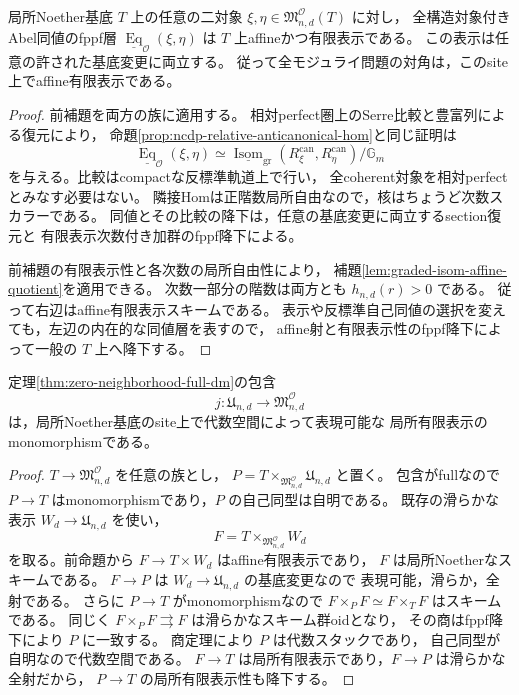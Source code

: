 \begin{proposition}[任意の二族のアフィン有限表示同値層]
\label{prop:full-moduli-affine-diagonal}
局所Noether基底 $T$ 上の任意の二対象
$\xi,\eta\in\mathfrak M^{\mathcal O}_{n,d}(T)$ に対し，
全構造対象付きAbel同値のfppf層
$\underline{\operatorname{Eq}}_{\mathcal O}(\xi,\eta)$ は
$T$ 上affineかつ有限表示である。
この表示は任意の許された基底変更に両立する。
従って全モジュライ問題の対角は，このsite上でaffine有限表示である。
\end{proposition}
\begin{proof}
前補題を両方の族に適用する。
相対perfect圏上のSerre比較と豊富列による復元により，
命題\ref{prop:ncdp-relative-anticanonical-hom}と同じ証明は
\[
 \underline{\operatorname{Eq}}_{\mathcal O}(\xi,\eta)
 \simeq
 \underline{\operatorname{Isom}}_{\mathrm{gr}}
       (R^{\mathrm{can}}_\xi,R^{\mathrm{can}}_\eta)/\mathbb G_m
\]
を与える。比較はcompactな反標準軌道上で行い，
全coherent対象を相対perfectとみなす必要はない。
隣接Homは正階数局所自由なので，核はちょうど次数スカラーである。
同値とその比較の降下は，任意の基底変更に両立するsection復元と
有限表示次数付き加群のfppf降下による。

前補題の有限表示性と各次数の局所自由性により，
補題\ref{lem:graded-isom-affine-quotient}を適用できる。
次数一部分の階数は両方とも $h_{n,d}(r)>0$ である。
従って右辺はaffine有限表示スキームである。
表示や反標準自己同値の選択を変えても，左辺の内在的な同値層を表すので，
affine射と有限表示性のfppf降下によって一般の $T$ 上へ降下する。
\end{proof}

\begin{proposition}[構成部分問題の包含の表現可能性]
\label{prop:constructed-substack-representable-lfp}
定理\ref{thm:zero-neighborhood-full-dm}の包含
\[
 j:\mathfrak U_{n,d}\longrightarrow\mathfrak M^{\mathcal O}_{n,d}
\]
は，局所Noether基底のsite上で代数空間によって表現可能な
局所有限表示のmonomorphismである。
\end{proposition}
\begin{proof}
$T\to\mathfrak M^{\mathcal O}_{n,d}$ を任意の族とし，
$P=T\times_{\mathfrak M^{\mathcal O}_{n,d}}\mathfrak U_{n,d}$ と置く。
包含がfullなので $P\to T$ はmonomorphismであり，$P$ の自己同型は自明である。
既存の滑らかな表示 $W_d\to\mathfrak U_{n,d}$ を使い，
\[
 F=T\times_{\mathfrak M^{\mathcal O}_{n,d}}W_d
\]
を取る。前命題から $F\to T\times W_d$ はaffine有限表示であり，
$F$ は局所Noetherなスキームである。
$F\to P$ は $W_d\to\mathfrak U_{n,d}$ の基底変更なので
表現可能，滑らか，全射である。
さらに $P\to T$ がmonomorphismなので
$F\times_PF\simeq F\times_TF$ はスキームである。
同じく $F\times_PF\rightrightarrows F$ は滑らかなスキーム群oidとなり，
その商はfppf降下により $P$ に一致する。
商定理\cite[Tag~04TK]{StacksProject}により $P$ は代数スタックであり，
自己同型が自明なので代数空間である\cite[Tag~04SZ]{StacksProject}。
$F\to T$ は局所有限表示であり，$F\to P$ は滑らかな全射だから，
$P\to T$ の局所有限表示性も降下する。
\end{proof}

